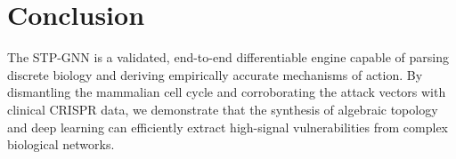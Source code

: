 \documentclass[11pt,a4paper]{article}
\begin{document}
\section{Conclusion}
The STP-GNN is a validated, end-to-end differentiable engine capable of parsing discrete biology and deriving empirically accurate mechanisms of action. By dismantling the mammalian cell cycle and corroborating the attack vectors with clinical CRISPR data, we demonstrate that the synthesis of algebraic topology and deep learning can efficiently extract high-signal vulnerabilities from complex biological networks.
\end{document}
